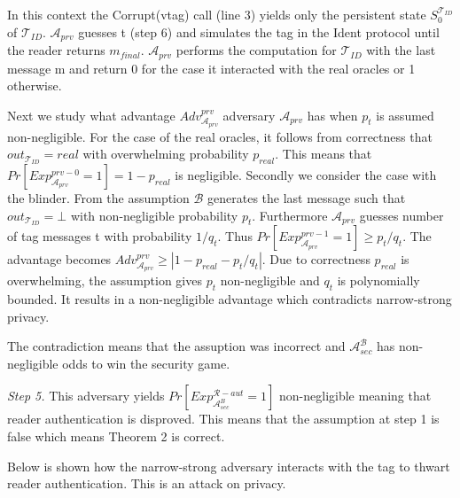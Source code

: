     In this context the Corrupt(vtag) call (line 3) yields only the persistent state $S_0^{\mathcal{T}_{ID}}$ of 
    $\mathcal{T}_{ID}$. $\mathcal{A}_{prv}$ guesses t (step 6) and simulates the tag in the Ident protocol until 
    the reader returns $m_{final}$. $\mathcal{A}_{prv}$ performs the computation for $\mathcal{T}_{ID}$ with the last
    message m and return 0 for the case it interacted with the real oracles or 1 otherwise.

    Next we study what advantage $Adv_{\mathcal{A}_{prv}}^{prv}$ adversary $\mathcal{A}_{prv}$ has when $p_t$ is assumed non-negligible.
    For the case of the real oracles, it follows from correctness that $out_{\mathcal{T}_{ID}} = real$ with overwhelming
    probability $p_{real}$. This means that $Pr[Exp_{\mathcal{A}_{prv}}^{prv-0} = 1] = 1-p_{real}$ is negligible. Secondly we consider the case
    with the blinder. From the assumption $\mathcal{B}$ generates the last message such that $out_{\mathcal{T}_{ID}} = \bot$ with 
    non-negligible probability $p_t$. Furthermore $\mathcal{A}_{prv}$ guesses number of tag messages t with 
    probability $1/q_t$. Thus $Pr[Exp_{\mathcal{A}_{prv}}^{prv-1} = 1] \ge p_t/q_t$. The advantage becomes
    $Adv_{\mathcal{A}_{prv}}^{prv} \ge |1-p_{real}-p_t/q_t|$. Due to correctness $p_{real}$ is overwhelming, the 
    assumption gives $p_t$ non-negligible and $q_t$ is polynomially bounded. It results in a non-negligible 
    advantage which contradicts narrow-strong privacy.

    The contradiction means that the assuption was incorrect and $\mathcal{A}_{sec}^{\mathcal{B}}$ has non-negligible odds to win the security game.

    \textit{Step 5.} This adversary yields $Pr[Exp_{\mathcal{A}_{sec}^{B}}^{\mathcal{R}-aut} = 1]$ non-negligible meaning that reader authentication is disproved. 
    This means that the assumption at step 1 is false which means Theorem 2 is correct. 

    Below is shown how the narrow-strong adversary interacts with the tag to
    thwart reader authentication. This is an attack on privacy.

